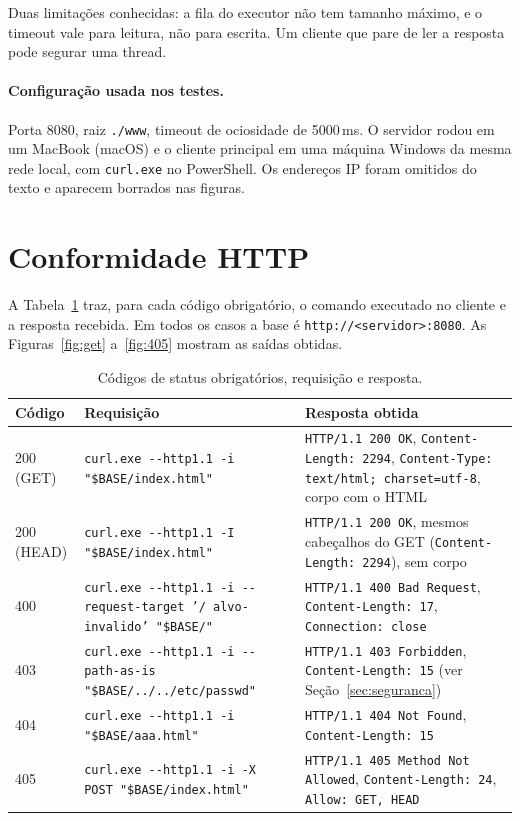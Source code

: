 \documentclass[11pt,a4paper]{article}
\newcommand{\cod}[1]{\texttt{#1}}
\begin{document}
Duas limitações conhecidas: a fila do executor não tem tamanho máximo, e o
timeout vale para leitura, não para escrita. Um cliente que pare de ler a
resposta pode segurar uma thread.

\paragraph{Configuração usada nos testes.} Porta 8080, raiz \cod{./www},
timeout de ociosidade de 5000\,ms. O servidor rodou em um MacBook (macOS) e o cliente principal em uma máquina Windows
da mesma rede local, com \cod{curl.exe} no PowerShell. Os endereços IP foram
omitidos do texto e aparecem borrados nas figuras.

\section{Conformidade HTTP}

{\sloppy A Tabela~\ref{tab:conformidade} traz, para cada código obrigatório, o comando
executado no cliente e a resposta recebida. Em todos os casos a base é
\cod{http://<servidor>:8080}. As Figuras~\ref{fig:get} a~\ref{fig:405}
mostram as saídas obtidas.\par}

\begin{table}[H]
\centering
\small
\begin{tabularx}{\textwidth}{@{}l>{\raggedright\arraybackslash}X>{\raggedright\arraybackslash}X@{}}
\toprule
\textbf{Código} & \textbf{Requisição} & \textbf{Resposta obtida} \\
\midrule
200 (GET) & \cod{curl.exe -{}-http1.1 -i "\$BASE/index.html"} &
\cod{HTTP/1.1 200 OK}, \cod{Content-Length: 2294}, \cod{Content-Type:
text/html; charset=utf-8}, corpo com o HTML \\
200 (HEAD) & \cod{curl.exe -{}-http1.1 -I "\$BASE/index.html"} &
\cod{HTTP/1.1 200 OK}, mesmos cabeçalhos do GET (\cod{Content-Length: 2294}),
sem corpo \\
400 & \cod{curl.exe -{}-http1.1 -i -{}-request-target '/ alvo-invalido'
"\$BASE/"} & \cod{HTTP/1.1 400 Bad Request}, \cod{Content-Length: 17},
\cod{Connection: close} \\
403 & \cod{curl.exe -{}-http1.1 -i -{}-path-as-is "\$BASE/../../etc/passwd"} &
\cod{HTTP/1.1 403 Forbidden}, \cod{Content-Length: 15} (ver
Seção~\ref{sec:seguranca}) \\
404 & \cod{curl.exe -{}-http1.1 -i "\$BASE/aaa.html"} &
\cod{HTTP/1.1 404 Not Found}, \cod{Content-Length: 15} \\
405 & \cod{curl.exe -{}-http1.1 -i -X POST "\$BASE/index.html"} &
\cod{HTTP/1.1 405 Method Not Allowed}, \cod{Content-Length: 24},
\cod{Allow: GET, HEAD} \\
\bottomrule
\end{tabularx}
\caption{Códigos de status obrigatórios, requisição e resposta.}
\label{tab:conformidade}
\end{table}
\end{document}
